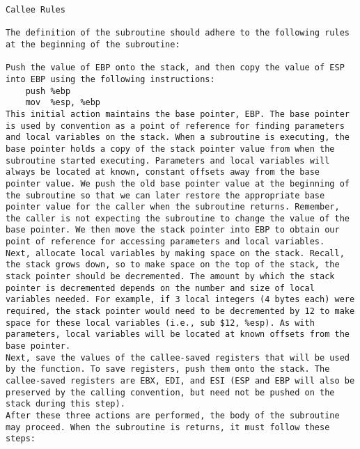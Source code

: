 \documentclass[10pt]{article}
\begin{document}
{\begin{multicols*}{5}
\begin{lstlisting}[breaklines=true,columns=fullflexible]
Callee Rules

The definition of the subroutine should adhere to the following rules at the beginning of the subroutine:

Push the value of EBP onto the stack, and then copy the value of ESP into EBP using the following instructions:
    push %ebp
    mov  %esp, %ebp
This initial action maintains the base pointer, EBP. The base pointer is used by convention as a point of reference for finding parameters and local variables on the stack. When a subroutine is executing, the base pointer holds a copy of the stack pointer value from when the subroutine started executing. Parameters and local variables will always be located at known, constant offsets away from the base pointer value. We push the old base pointer value at the beginning of the subroutine so that we can later restore the appropriate base pointer value for the caller when the subroutine returns. Remember, the caller is not expecting the subroutine to change the value of the base pointer. We then move the stack pointer into EBP to obtain our point of reference for accessing parameters and local variables.
Next, allocate local variables by making space on the stack. Recall, the stack grows down, so to make space on the top of the stack, the stack pointer should be decremented. The amount by which the stack pointer is decremented depends on the number and size of local variables needed. For example, if 3 local integers (4 bytes each) were required, the stack pointer would need to be decremented by 12 to make space for these local variables (i.e., sub $12, %esp). As with parameters, local variables will be located at known offsets from the base pointer.
Next, save the values of the callee-saved registers that will be used by the function. To save registers, push them onto the stack. The callee-saved registers are EBX, EDI, and ESI (ESP and EBP will also be preserved by the calling convention, but need not be pushed on the stack during this step).
After these three actions are performed, the body of the subroutine may proceed. When the subroutine is returns, it must follow these steps:


\end{lstlisting}
\end{multicols*}}
\end{document}
